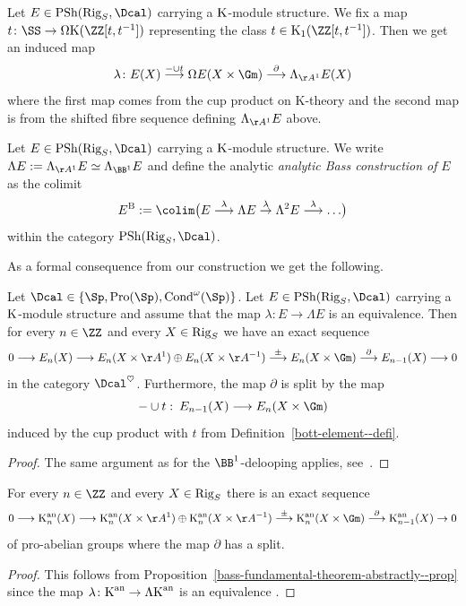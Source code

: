 \documentclass[colorinlistoftodos,article,11pt,reqno]{article}
\newcommand{\Rig}{\textup{Rig}}
\newcommand{\Pro}{\textup{Pro}}
\newcommand{\Cond}{\textup{Cond}}
\newcommand{\PSh}{\textup{PSh}}
\newcommand{\K}{\textup{K}}
\newcommand{\Kan}{\K^\textup{an}}
\newcommand{\Arig}{\AA^{1}}
\newcommand{\Brig}{\BB^{1}}
\renewcommand{\to}[1][]{\overset{#1}{\rightarrow}}
\newcommand{\To}[1][]{\overset{#1}{\longrightarrow}}
\begin{document}
\begin{defi} \label{bott-element--defi}
Let $E\in\PSh(\Rig_S,\Dcal)$ carrying a $\K$-module structure. We fix a map $t\colon\SS\to\Omega\K(\ZZ[t,t^{-1}])$ representing the class $t\in\K_1(\ZZ[t,t^{-1}])$. Then we get an induced map
\[ \lambda \colon E(X) \To[-\cup t] \Omega E(X\times\Gm) \To[\partial] \Lambda_{\Arig}E(X) \]
where the first map comes from the cup product on K-theory and the second map is from the shifted fibre sequence defining $\Lambda_{\Arig}E$ above.
\end{defi}

\begin{defi} \label{analytic-bass-construction--defi}
Let $E\in\PSh(\Rig_S,\Dcal)$ carrying a $\K$-module structure. We write $\Lambda E := \Lambda_{\Arig}E \simeq\Lambda_{\Brig}E$ and define the analytic \emph{analytic Bass construction of} $E$  as the colimit
\[ E^\textup{B} := \colim\bigl( E \To[\lambda] \Lambda E \to[\lambda] \Lambda^2 E \To[\lambda] \ldots \bigr) \]
within the category $\PSh(\Rig_S,\Dcal)$.
\end{defi}


As a formal consequence from our construction we get the following.

\begin{prop} \label{bass-fundamental-theorem-abstractly--prop}
Let $\Dcal\in\{\Sp,\Pro(\Sp),\Cond^\omega(\Sp)\}$.
Let $E\in\PSh(\Rig_S,\Dcal)$ carrying a $\K$-module structure and assume that the map $\lambda \colon E\to \Lambda E$ is an equivalence. Then for every $n\in\ZZ$ and every $X\in\Rig_S$ we have an exact sequence
\[ 0 \To E_n(X) \To E_n(X\times\Arig) \oplus E_n(X\times\AA^{-1}) \To[\pm] E_{n}(X\times\Gm) \To[\partial] E_{n-1}(X) \To 0 \]
in the category $\Dcal^\heartsuit$. Furthermore, the map $\partial$ is split by the map
\[
-\cup t \,\colon\, E_{n-1}(X) \To E_n(X\times\Gm) 
\]
induced by the cup product with $t$ from Definition~\ref{bott-element--defi}.
\end{prop}
\begin{proof}
The same argument as for the $\Brig$-delooping applies, see~\cite[Prop.~4.13]{kst-i}.
\end{proof}

\begin{cor} \label{bass-fundamental-theorem-for-Kan--cor}
For every $n\in\ZZ$ and every $X\in\Rig_S$ there is an exact sequence
\[ 0 \To \Kan_n(X) \To \Kan_n(X\times\Arig) \oplus \Kan_n(X\times\AA^{-1}) \To[\pm] \Kan_{n}(X\times\Gm) \To[\partial] \Kan_{n-1}(X) \to 0 \]
of pro-abelian groups where the map $\partial$ has a split.
\end{cor}
\begin{proof}
This follows from Proposition~\ref{bass-fundamental-theorem-abstractly--prop} since the map $\lambda \colon \Kan \to \Lambda\Kan$ is an equivalence \cite[Cor.~2.6]{kst-ii}.
\end{proof}
\end{document}
